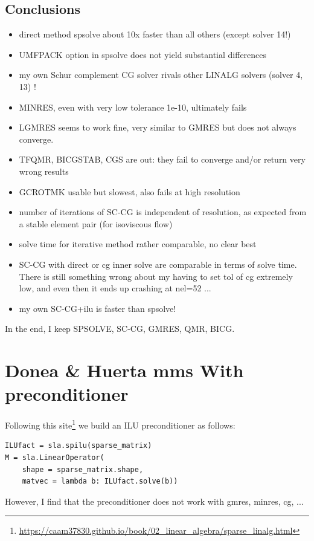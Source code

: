 \subsection*{Conclusions}

\begin{itemize}
\item direct method spsolve about 10x faster than all others (except solver 14!)
\item UMFPACK option in spsolve does not yield substantial differences
\item my own Schur complement CG solver rivals other LINALG solvers (solver 4, 13) ! 
\item MINRES, even with very low tolerance 1e-10, ultimately fails
\item LGMRES seems to work fine, very similar to GMRES but does not always converge.
\item TFQMR, BICGSTAB, CGS are out: they fail to converge and/or return 
very wrong results
\item GCROTMK usable but slowest, also fails at high resolution 
\item number of iterations of SC-CG is independent of resolution, as expected
from a stable element pair (for isoviscous flow)
\item solve time for iterative method rather comparable, no clear best
\item SC-CG with direct or cg inner solve are comparable in terms of 
solve time. There is still something wrong about my having to 
set tol of cg extremely low, and even then it ends up crashing at nel=52 ...
\item my own SC-CG+ilu is faster than spsolve!
\end{itemize}

In the end, I keep SPSOLVE, SC-CG, GMRES, QMR, BICG.

\newpage
\section*{Donea \& Huerta mms With preconditioner}

Following this site\footnote{\url{https://caam37830.github.io/book/02_linear_algebra/sparse_linalg.html}}
we build an ILU preconditioner as follows:
\begin{lstlisting}
ILUfact = sla.spilu(sparse_matrix)
M = sla.LinearOperator(
    shape = sparse_matrix.shape,
    matvec = lambda b: ILUfact.solve(b))
\end{lstlisting}
However, I find that the preconditioner does not work with gmres, minres, cg, ...

